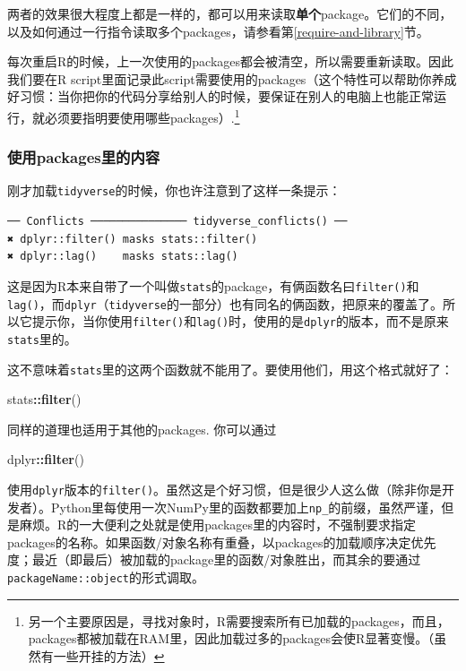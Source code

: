 \documentclass[]{book}
\newenvironment{Shaded}{\begin{snugshade}}{\end{snugshade}}
\newcommand{\KeywordTok}[1]{\textcolor[rgb]{0.13,0.29,0.53}{\textbf{#1}}}
\newcommand{\NormalTok}[1]{#1}
\newcommand{\OperatorTok}[1]{\textcolor[rgb]{0.81,0.36,0.00}{\textbf{#1}}}
\let\rmarkdownfootnote\footnote%
\def\footnote{\protect\rmarkdownfootnote}
\begin{document}
两者的效果很大程度上都是一样的，都可以用来读取\textbf{单个}package。它们的不同，以及如何通过一行指令读取多个packages，请参看第\ref{require-and-library}节。

每次重启R的时候，上一次使用的packages都会被清空，所以需要重新读取。因此我们要在R script里面记录此script需要使用的packages（这个特性可以帮助你养成好习惯：当你把你的代码分享给别人的时候，要保证在别人的电脑上也能正常运行，就必须要指明要使用哪些packages）.\footnote{另一个主要原因是，寻找对象时，R需要搜索所有已加载的packages，而且，packages都被加载在RAM里，因此加载过多的packages会使R显著变慢。（虽然有一些开挂的方法）}

\hypertarget{pkg-colon}{%
\subsubsection{使用packages里的内容}\label{pkg-colon}}

刚才加载\texttt{tidyverse}的时候，你也许注意到了这样一条提示：

\begin{verbatim}
── Conflicts ─────────────── tidyverse_conflicts() ──
✖ dplyr::filter() masks stats::filter()
✖ dplyr::lag()    masks stats::lag()
\end{verbatim}

这是因为R本来自带了一个叫做\texttt{stats}的package，有俩函数名曰\texttt{filter()}和\texttt{lag()}，而\texttt{dplyr}（\texttt{tidyverse}的一部分）也有同名的俩函数，把原来的覆盖了。所以它提示你，当你使用\texttt{filter()}和\texttt{lag()}时，使用的是\texttt{dplyr}的版本，而不是原来\texttt{stats}里的。

这不意味着\texttt{stats}里的这两个函数就不能用了。要使用他们，用这个格式就好了：

\begin{Shaded}
\begin{Highlighting}[]
\NormalTok{stats}\OperatorTok{::}\KeywordTok{filter}\NormalTok{()}
\end{Highlighting}
\end{Shaded}

同样的道理也适用于其他的packages. 你可以通过

\begin{Shaded}
\begin{Highlighting}[]
\NormalTok{dplyr}\OperatorTok{::}\KeywordTok{filter}\NormalTok{()}
\end{Highlighting}
\end{Shaded}

使用\texttt{dplyr}版本的\texttt{filter()}。虽然这是个好习惯，但是很少人这么做（除非你是开发者）。Python里每使用一次NumPy里的函数都要加上\texttt{np\_}的前缀，虽然严谨，但是麻烦。R的一大便利之处就是使用packages里的内容时，不强制要求指定packages的名称。如果函数/对象名称有重叠，以packages的加载顺序决定优先度；最近（即最后）被加载的package里的函数/对象胜出，而其余的要通过\texttt{packageName::object}的形式调取。
\end{document}
